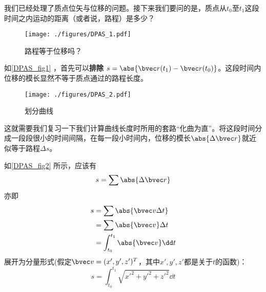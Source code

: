 
我们已经处理了质点位矢与位移的问题。接下来我们要问的是，质点从$t_0$至$t_1$这段时间之内运动的距离（或者说，路程）是多少？

\begin{figure}[ht]
\centering
\texttt{[image: ./figures/DPAS\_1.pdf]}
\caption{路程等于位移吗？} \label{DPAS_fig1}
\end{figure}

如\autoref{DPAS_fig1} ，首先可以\textbf{排除} $s = \abs{\bvec r(t_1) - \bvec r(t_0)}  $。这段时间内位移的模长显然不等于质点通过的路程长度。

\begin{figure}[ht]
\centering
\texttt{[image: ./figures/DPAS\_2.pdf]}
\caption{划分曲线} \label{DPAS_fig2}
\end{figure}

这就需要我们复习一下我们计算曲线长度时所用的套路“化曲为直”。将这段时间分成一段段很小的时间间隔，在每一段小时间内，位移的模长$\abs{\Delta \bvec r}$就近似等于路程$\Delta s$。

如\autoref{DPAS_fig2} 所示，应该有 $$s=\sum \abs{\Delta \bvec r}$$
亦即$$
\begin{aligned}
s&=\sum \abs{\bvec v \Delta t}\\
&=\sum \abs{\bvec v} \Delta t\\
&=\int _{t_0}^{t_1} \abs{\bvec v} \dd t\\
\end{aligned}
$$
展开为分量形式(假定$\bvec v = (x',y',z')^T$，其中$x',y',z'$都是关于$t$的函数)：
$$
s = \int _{t_0}^{t_1} \sqrt{x'^2+y'^2+z'^2} \dd t
$$

